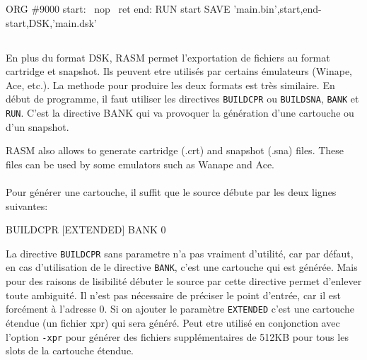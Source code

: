 \begin{code}
ORG \#9000
\medskip
start:
\ nop
\ ret
end:
\medskip
RUN start
SAVE 'main.bin',start,end-start,DSK,'main.dsk'

\end{code}





\subsection{}
\begin{xen}
\end{xen}
\begin{xfr}
\end{xfr}

\begin{xfr}
En plus du format DSK, RASM permet l'exportation de fichiers au format cartridge et snapshot. Ils peuvent etre utilisés par certains émulateurs (Winape, Ace, etc.). La methode pour produire les deux formats est très similaire. En début de programme, il faut utiliser les directives \texttt{BUILDCPR} ou \texttt{BUILDSNA}, \texttt{BANK} et \texttt{RUN}. C'est la directive BANK qui va provoquer la génération d'une cartouche ou d'un snapshot.
\end{xfr}

\begin{xen}
RASM also allows to generate cartridge (.crt) and snapshot (.sna) files. These files can be used by some emulators such as Wanape and Ace.
\end{xen}

\paragraph{}

\begin{xfr}
Pour générer une cartouche, il suffit que le source débute par les deux lignes suivantes:
\end{xfr}

\begin{code}
BUILDCPR [EXTENDED]
BANK 0
\end{code}

\begin{xfr}
La directive \texttt{BUILDCPR} sans parametre n'a pas vraiment d'utilité, car par défaut, en cas d'utilisation de le directive \texttt{BANK}, c'est une cartouche qui est générée. Mais pour des raisons de lisibilité débuter le source par cette directive permet d'enlever toute ambiguité.
Il n'est pas nécessaire de préciser le point d'entrée, car il est forcément à l'adresse 0.
Si on ajouter le paramètre \texttt{EXTENDED} c'est une cartouche étendue (un fichier xpr) qui sera généré.
Peut etre utilisé en conjonction avec l'option \texttt{-xpr} pour générer des fichiers supplémentaires de 512KB pour tous les slots de la cartouche étendue.
\end{xfr}

